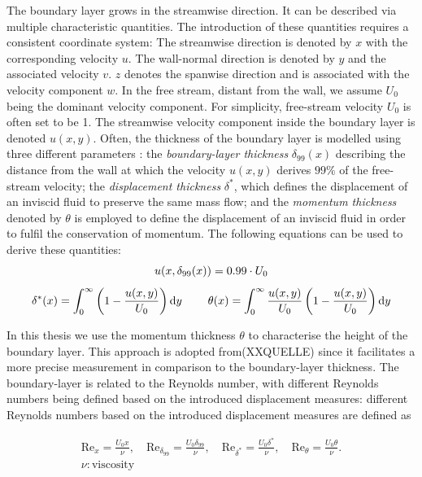 The boundary layer grows in the streamwise direction. It can be described via multiple characteristic quantities. 
The introduction of these quantities requires a consistent coordinate system: 
The streamwise direction  is denoted by  $x$  with the corresponding velocity $u$. The wall-normal direction is denoted by $y$ and the associated velocity  $v$.  $z$ denotes the spanwise direction and is associated with the  velocity component $w$.
In the free stream, distant from the wall, we assume $U_0$ being the dominant velocity component. 
For simplicity,  free-stream velocity $U_0$  is often set to be 1. 
The streamwise velocity component inside the boundary layer is denoted  $u(x,y)$.
Often, the thickness of the boundary layer is modelled using three different parameters : 
the \emph{boundary-layer thickness} $\delta_{99}(x)$ describing the distance from the wall at which the velocity $u(x,y)$ derives $99\%$ of the free-stream velocity;
the \emph{displacement thickness} $\delta^*$, which defines the displacement of an inviscid fluid to preserve the same mass flow;
and the \emph{momentum thickness} denoted by  $\theta$  is employed to define the displacement of an inviscid fluid in order to fulfil the conservation of momentum.
The following equations can be used to derive these quantities:
\begin{gather}\label{eq: tblThickness}
    u (x, \delta_{99}(x)) = 0.99 \cdot U_0 \\[1ex]
    \delta^*(x) = \int_0^\infty \left( 1 - \frac{u(x,y)}{U_0} \right) \mathrm{d}y \hspace{0.8cm}
     \theta(x) = \int_0^\infty \frac{u(x,y)}{U_0} \left( 1 - \frac{u(x,y)}{U_0} \right) \mathrm{d}y
\end{gather}


In this thesis we use the momentum thickness $\theta$ to characterise the height of the boundary layer.
This approach is adopted from(XXQUELLE)  since it facilitates a  more precise measurement in comparison to the boundary-layer thickness. 
The boundary-layer is related to the Reynolds number, 
with different Reynolds numbers being defined based on the introduced displacement measures:
different Reynolds numbers based on the introduced displacement measures are defined as

\begin{gather}
    \mathrm{Re}_x = \frac{U_0 x}{\nu}, \quad
    \mathrm{Re}_{\delta_{99}} = \frac{U_0 \delta_{99}}{\nu}, \quad
    \mathrm{Re}_{\delta^*} = \frac{U_0 \delta^*}{\nu}, \quad
    \mathrm{Re}_\theta = \frac{U_0 \theta}{\nu}. \\
    \nu : \text{viscosity} \nonumber
\end{gather}


